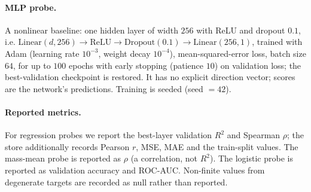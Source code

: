 \paragraph{MLP probe.}
A nonlinear baseline: one hidden layer of width $256$ with ReLU and dropout
$0.1$, i.e. $\mathrm{Linear}(d,256)\!\to\!\mathrm{ReLU}\!\to\!\mathrm{Dropout}
(0.1)\!\to\!\mathrm{Linear}(256,1)$, trained with Adam (learning rate $10^{-3}$,
weight decay $10^{-4}$), mean-squared-error loss, batch size $64$, for up to
$100$ epochs with early stopping (patience $10$) on validation loss; the
best-validation checkpoint is restored. It has no explicit direction vector;
scores are the network's predictions. Training is seeded (seed $=42$).

\paragraph{Reported metrics.}
For regression probes we report the best-layer validation $R^2$ and Spearman
$\rho$; the store additionally records Pearson $r$, MSE, MAE and the train-split
values. The mass-mean probe is reported as $\rho$ (a correlation, not $R^2$).
The logistic probe is reported as validation accuracy and ROC-AUC. Non-finite
values from degenerate targets are recorded as null rather than reported.

